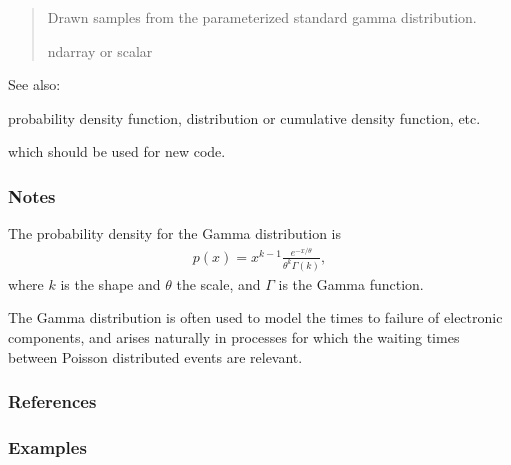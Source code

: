 \documentclass[letterpaper,10pt,english]{sphinxmanual}
\begin{document}
\begin{fulllineitems}
\begin{quote}
\begin{description}
\begin{itemize}
\end{itemize}

\sphinxAtStartPar
{} \textendash{} Drawn samples from the parameterized standard gamma distribution.

\sphinxAtStartPar
ndarray or scalar

\end{description}\end{quote}


\begin{sphinxseealso}{See also:}
\begin{description}
\sphinxAtStartPar
probability density function, distribution or cumulative density function, etc.

\sphinxAtStartPar
which should be used for new code.

\end{description}


\end{sphinxseealso}

\subsubsection*{Notes}

\sphinxAtStartPar
The probability density for the Gamma distribution is
\begin{equation*}
\begin{split}p(x) = x^{k-1}\frac{e^{-x/\theta}}{\theta^k\Gamma(k)},\end{split}
\end{equation*}
\sphinxAtStartPar
where \(k\) is the shape and \(\theta\) the scale,
and \(\Gamma\) is the Gamma function.

\sphinxAtStartPar
The Gamma distribution is often used to model the times to failure of
electronic components, and arises naturally in processes for which the
waiting times between Poisson distributed events are relevant.
\subsubsection*{References}
\subsubsection*{Examples}


\end{fulllineitems}
\end{document}
